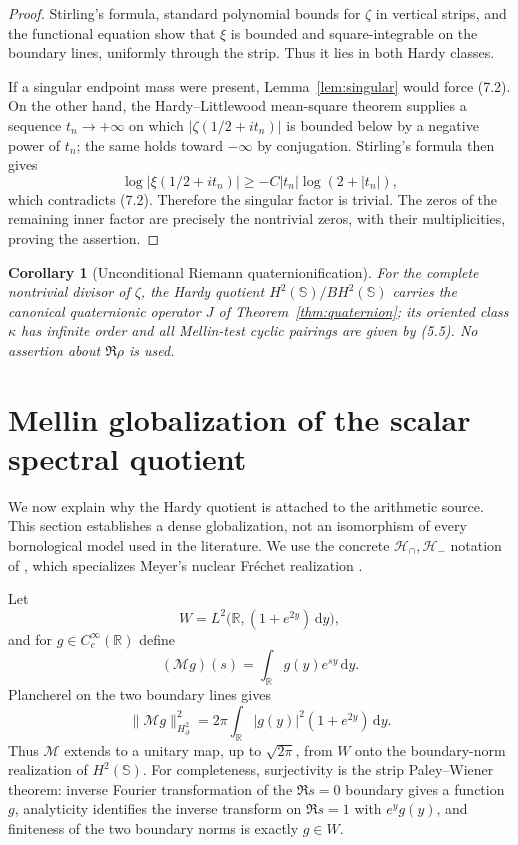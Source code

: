 \documentclass[11pt]{article}
\newtheorem{corollary}[theorem]{Corollary}
\theoremstyle{definition}
\theoremstyle{remark}
\newcommand{\R}{\mathbb R}
\newcommand{\Hh}{\mathcal H}
\newcommand{\cM}{\mathcal M}
\newcommand{\dd}{\,\mathrm d}
\begin{document}
\begin{proof}
Stirling's formula, standard polynomial bounds for $\zeta$ in vertical strips,
and the functional equation \cite[Chs.~IV and IX]{Titchmarsh1986} show that
$\xi$ is bounded and square-integrable
on the boundary lines, uniformly through the strip.  Thus it lies in both
Hardy classes.

If a singular endpoint mass were present, Lemma~\ref{lem:singular} would force
(7.2).  On the other hand, the Hardy--Littlewood mean-square theorem
\cite[Ch.~VII]{Titchmarsh1986} supplies a
sequence $t_n\to+\infty$ on which $|\zeta(1/2+it_n)|$ is bounded below by a
negative power of $t_n$; the same holds toward $-\infty$ by conjugation.
Stirling's formula then gives
\[
        \log|\xi(1/2+it_n)|\ge -C|t_n|\log(2+|t_n|),  \tag{7.3}
\]
which contradicts (7.2).  Therefore the singular factor is trivial.  The zeros
of the remaining inner factor are precisely the nontrivial zeros, with their
multiplicities, proving the assertion.
\end{proof}

\begin{corollary}[Unconditional Riemann quaternionification]
\label{cor:zeta}
For the complete nontrivial divisor of $\zeta$, the Hardy quotient
$H^2(\mathbb S)/BH^2(\mathbb S)$ carries the canonical quaternionic operator
$J$ of Theorem~\ref{thm:quaternion}; its oriented class $\kappa$ has infinite
order and all Mellin-test cyclic pairings are given by (5.5).  No assertion
about $\Re\rho$ is used.
\end{corollary}

\section{Mellin globalization of the scalar spectral quotient}

We now explain why the Hardy quotient is attached to the arithmetic source.
This section establishes a dense globalization, not an isomorphism of every
bornological model used in the literature.  We use the concrete
$\Hh_\cap,\Hh_-$ notation of \cite{Li2019}, which specializes Meyer's nuclear
Fr\'echet realization \cite{Meyer2005}.

Let
\[
       W=L^2\bigl(\R,(1+e^{2y})\dd y\bigr),           \tag{8.1}
\]
and for $g\in C_c^\infty(\R)$ define
\[
       (\cM g)(s)=\int_\R g(y)e^{sy}\dd y.            \tag{8.2}
\]
Plancherel on the two boundary lines gives
\[
 \|\cM g\|_{H^2_\partial}^2
 =2\pi\int_\R |g(y)|^2(1+e^{2y})\dd y.               \tag{8.3}
\]
Thus $\cM$ extends to a unitary map, up to $\sqrt{2\pi}$, from $W$ onto the
boundary-norm realization of $H^2(\mathbb S)$.  For completeness, surjectivity
is the strip Paley--Wiener theorem: inverse Fourier transformation of the
$\Re s=0$ boundary gives a function $g$, analyticity identifies the inverse
transform on $\Re s=1$ with $e^yg(y)$, and finiteness of the two boundary norms
is exactly $g\in W$.
\end{document}
